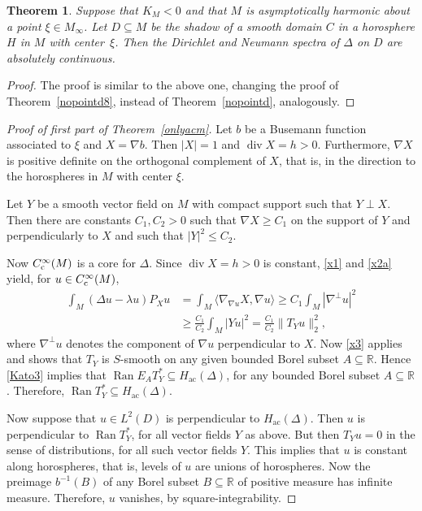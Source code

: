 \documentclass[10pt,a4paper]{amsart}
\numberwithin{equation}{section}
\newtheorem{Theorem}{Theorem}[section]
\DeclareMathOperator{\diver}{div}
\DeclareMathOperator{\ran}{Ran}
\def\ac{\mathrm{ac}}
\def\R{\mathbb R}
\begin{document}
\begin{Theorem}%
Suppose that $K_M<0$ and that $M$ is asymptotically harmonic about a point $\xi\in M_\infty$.
Let $D\subseteq M$ be the shadow of a smooth domain $C$ in a horosphere $H$ in $M$ with center~$\xi$.
Then the Dirichlet and Neumann spectra of $\Delta$ on $D$ are absolutely continuous.
\end{Theorem}

\begin{proof}
The proof is similar to the above one,
changing the proof of Theorem~\ref{nopointd8}, instead of Theorem~\ref{nopointd}, analogously.
\end{proof}

\begin{proof}[Proof of first part of Theorem~\ref{onlyacm}]
Let $b$ be a Busemann function associated to $\xi$ and ${X=\nabla b}$.
Then $|X|=1$ and $\diver X=h>0$.
Furthermore, $\nabla X$ is positive definite on the orthogonal complement of $X$,
that is, in the direction to the horospheres in $M$ with center $\xi$.

Let $Y$ be a smooth vector field on $M$ with compact support such that $Y\perp X$.
Then there are constants $C_1,C_2>0$ such that $\nabla X\ge C_1$ on the support of $Y$ and perpendicularly to $X$
and such that $|Y|^2\le C_2$.

Now $C^\infty_{\rm c}(M)$ is a core for $\Delta$.
Since $\diver X=h>0$ is constant, \eqref{x1} and \eqref{x2a} yield, for $u\in C^\infty_{\rm c}(M)$,
\begin{align*}
 \int_M (\Delta u-\lambda u) P_Xu
 &= \int_M \langle\nabla_{\nabla u}X,\nabla u\rangle \ge C_1 \int_M|\nabla^\bot u|^2 \\
 &\ge \frac{C_1}{C_2}\int_M|Yu|^2 = \frac{C_1}{C_2}\|T_Yu\|_2^2,
\end{align*}
where $\nabla^\bot u$ denotes the component of $\nabla u$ perpendicular to $X$.
Now \eqref{x3} applies and shows that $T_Y$ is $S$-smooth on any given bounded Borel subset $A\subseteq\R$.
Hence \eqref{Kato3} implies that $\ran E_AT_Y^*\subseteq H_{\ac}(\Delta)$,
for any bounded Borel subset $A\subseteq\R$.
Therefore, $\ran T_Y^*\subseteq H_{\ac}(\Delta)$.

Now suppose that $u\in L^2(D )$ is perpendicular to $H_{\ac}(\Delta)$.
Then $u$ is perpendicular to $\ran T_Y^*$, for all vector fields $Y$ as above.
But then $T_Yu=0$ in the sense of distributions, for all such vector fields $Y$.
This implies that $u$ is constant along horospheres, that is, levels of $u$ are unions of horospheres.
Now the preimage $b^{-1}(B)$ of any Borel subset $B\subseteq\R$ of positive measure has infinite measure.
Therefore, $u$ vanishes, by square-integrability.
\end{proof}
\end{document}
